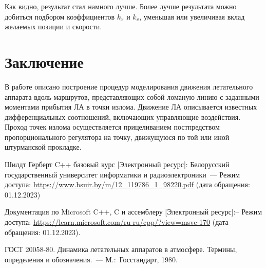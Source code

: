 \documentclass[a4paper,12pt]{article}
\begin{document}
Как видно, результат стал намного лучше. Более лучше результата можно добиться подбором коэффициентов $k_x$ и $k_v$, уменьшая или увеличивая вклад желаемых позиции и скорости.

\newpage
{}
\section*{Заключение}
В работе описано построение процедур моделирования движения летательного аппарата вдоль маршрутов, представляющих собой ломаную линию с заданными моментами прибытия ЛА в точки излома. Движение ЛА описывается известных дифференциальных соотношений, включающих управляющие воздействия. Проход точек излома осуществляется прицеливанием постпредством пропорционального регулятора на точку, движущуюся по той или иной штурманской прокладке.    
\newpage
{}
\begin{thebibliography}{99}
Шилдт Герберт C++ базовый курс  [Электронный ресурс]:
Белорусский государственный университет информатики и радиоэлектроники~--- Режим доступа: \url{https://www.bsuir.by/m/12_119786_1_98220.pdf}
(дата обращения: 01.12.2023)

Документация по Microsoft C++, C и ассемблеру [Электронный ресурс]:-- Режим доступа:
\url{https://learn.microsoft.com/ru-ru/cpp/?view=msvc-170} (дата обращения: 01.12.2023).

 ГОСТ 20058-80. Динамика летательных аппаратов в атмосфере. Термины, определения и обозначения.~--- М.:~Госстандарт, 1980.

\end{thebibliography}

\label{LastPage}
\end{document}
